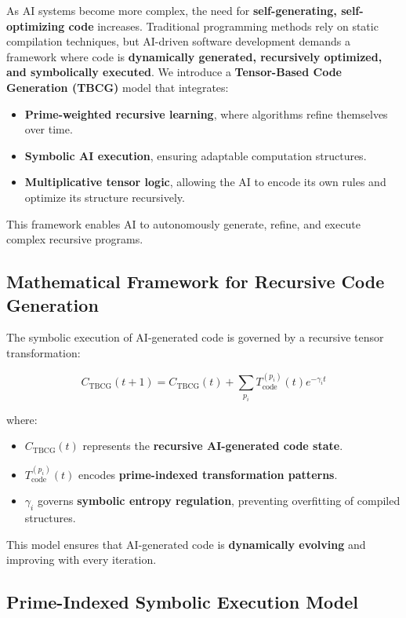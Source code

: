 \documentclass{article}
\theoremstyle{plain}
\theoremstyle{plain}
\theoremstyle{definition}
\theoremstyle{remark}
\begin{document}
As AI systems become more complex, the need for \textbf{self-generating, self-optimizing code} increases. Traditional programming methods rely on static compilation techniques, but AI-driven software development demands a framework where code is \textbf{dynamically generated, recursively optimized, and symbolically executed}. We introduce a \textbf{Tensor-Based Code Generation (TBCG)} model that integrates:
\begin{itemize}
    \item \textbf{Prime-weighted recursive learning}, where algorithms refine themselves over time.
    \item \textbf{Symbolic AI execution}, ensuring adaptable computation structures.
    \item \textbf{Multiplicative tensor logic}, allowing the AI to encode its own rules and optimize its structure recursively.
\end{itemize}

This framework enables AI to autonomously generate, refine, and execute complex recursive programs.

\subsection{Mathematical Framework for Recursive Code Generation}

The symbolic execution of AI-generated code is governed by a recursive tensor transformation:

\begin{equation}
C_{\text{TBCG}}(t+1) = C_{\text{TBCG}}(t) + \sum_{p_i} T_{\text{code}}^{(p_i)}(t) e^{-\gamma_i t}
\end{equation}

where:
\begin{itemize}
    \item $C_{\text{TBCG}}(t)$ represents the \textbf{recursive AI-generated code state}.
    \item $T_{\text{code}}^{(p_i)}(t)$ encodes \textbf{prime-indexed transformation patterns}.
    \item $\gamma_i$ governs \textbf{symbolic entropy regulation}, preventing overfitting of compiled structures.
\end{itemize}

This model ensures that AI-generated code is \textbf{dynamically evolving} and improving with every iteration.

\subsection{Prime-Indexed Symbolic Execution Model}
\end{document}

